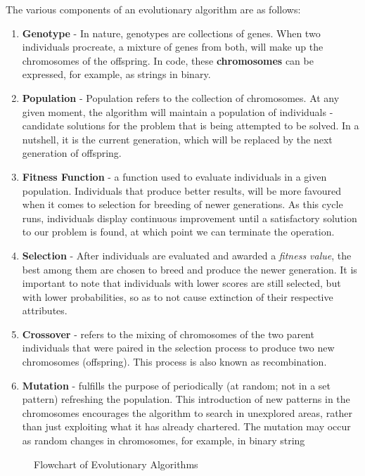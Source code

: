 \documentclass[conference,compsoc]{IEEEtran}
\begin{document}
The various components of an evolutionary algorithm are as follows:
\begin{enumerate}
    \item \textbf{Genotype} - In nature, genotypes are collections of genes. When two individuals procreate, a mixture of genes 
    from both, will make up the chromosomes of the offspring. In code, these \textbf{chromosomes} 
    can be expressed, for example, as strings in binary. 
    \item \textbf{Population} - Population refers to the collection of chromosomes. At any given moment, the 
    algorithm will maintain a population of individuals - candidate solutions for the problem that is being attempted 
    to be solved. In a nutshell, it is the current generation, which will be replaced by the next generation of offspring. 
    \item \textbf{Fitness Function} - a function used to evaluate individuals in a given population. Individuals 
    that produce better results, will be more favoured when it comes to selection for breeding of newer generations. As this cycle runs, 
    individuals display continuous improvement until a satisfactory solution to our problem is found, at which point we can terminate the operation.
    \item \textbf{Selection} - After individuals are evaluated and awarded a \textit{fitness value}, 
    the best among them are chosen to breed and produce the newer generation. It is important to note 
    that individuals with lower scores are still selected, but with lower probabilities, so as to not 
    cause extinction of their respective attributes.
    \item \textbf{Crossover} - refers to the mixing of chromosomes of the two parent individuals 
    that were paired in the selection process to produce two new chromosomes (offspring). This process is also known as recombination.
    \item \textbf{Mutation} - fulfills the purpose of periodically (at random; not in a set pattern) refreshing 
    the population. This introduction of new patterns in the chromosomes encourages the algorithm to search in unexplored areas, rather than 
    just exploiting what it has already chartered. The mutation may occur as random changes in chromosomes, for example, in binary string 
\end{enumerate}
\begin{figure}[ht]
  \centering
  \caption{Flowchart of Evolutionary Algorithms}
\end{figure}
\end{document}
